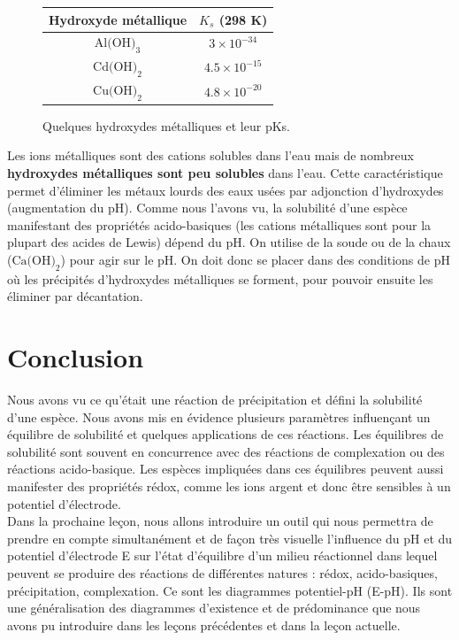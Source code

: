 \documentclass[11pt,a4paper]{report}
\begin{document}
\begin{figure}[h!]
	\begin{center}
		\begin{tabular}{|c|c|}
		\hline
			\textbf{Hydroxyde métallique} & $K_s$ (298 K)\\
		\hline
		 	$\text{Al(OH)}_3$ & $3\times 10^{-34}$\\
		\hline
			$\text{Cd(OH)}_2$ & $4.5\times 10^{-15}$\\
		\hline
		 	$\text{Cu(OH)}_2$ & $4.8\times 10^{-20}$\\
		\hline
		\end{tabular}	
	\end{center}
	\caption{Quelques hydroxydes métalliques et leur pKs.}
\end{figure}

Les ions métalliques sont des cations solubles dans l'eau mais de nombreux \textbf{hydroxydes métalliques sont peu solubles} dans l'eau. Cette caractéristique permet d'éliminer les métaux lourds des eaux usées par adjonction d’hydroxydes (augmentation du pH). Comme nous l'avons vu, la solubilité d'une espèce manifestant des propriétés acido-basiques (les cations métalliques sont pour la plupart des acides de Lewis) dépend du pH. On utilise de la soude ou de la chaux ($\text{Ca(OH)}_2$) pour agir sur le pH.
On doit donc se placer dans des conditions de pH où les précipités d'hydroxydes métalliques se forment, pour pouvoir ensuite les éliminer par décantation.

\section*{Conclusion}

Nous avons vu ce qu'était une réaction de précipitation et défini la solubilité d'une espèce. Nous avons
mis en évidence plusieurs paramètres influençant un équilibre de solubilité et quelques applications de ces réactions. Les équilibres de solubilité sont souvent en concurrence avec des réactions de complexation ou des réactions acido-basique. Les espèces impliquées dans ces équilibres peuvent aussi manifester des propriétés rédox, comme les ions argent et donc être sensibles à un potentiel d'électrode.\\

Dans la prochaine leçon, nous allons introduire un outil qui nous permettra de prendre en compte simultanément et de façon très visuelle l'influence du pH et du potentiel d'électrode E sur l'état d'équilibre d'un milieu réactionnel dans lequel peuvent se produire des réactions de différentes natures : rédox, acido-basiques, précipitation, complexation. Ce sont les diagrammes potentiel-pH (E-pH). Ils sont une généralisation des diagrammes d'existence et de prédominance que nous avons pu introduire dans les leçons précédentes et dans la leçon actuelle.
\end{document}
